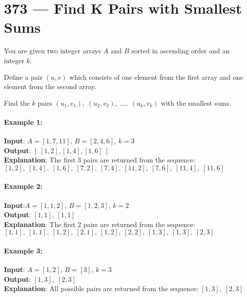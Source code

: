 \section{373 --- Find K Pairs with Smallest Sums}
You are given two integer arrays $ A $ and $ B $ sorted in ascending order and an integer $ k $.
\par
Define a pair $ (u,v) $ which consists of one element from the first array and one element from the second array.
\par
Find the $ k $ pairs $ (u_1,v_1),\; (u_2,v_2), \; \ldots,\;  (u_k,v_k) $ with the smallest sums.

\paragraph{Example 1:}

\begin{flushleft}
\textbf{Input}: $ A = [1,7,11] $, $ B = [2,4,6] $, $ k = 3 $
\\
\textbf{Output}: $[\;[1,2],[1,4],[1,6]\;]$ 
\\
\textbf{Explanation}: The first 3 pairs are returned from the sequence: 
            $  [1,2],\;[1,4],\;[1,6],\;[7,2],\;[7,4],\;[11,2],\;[7,6],\;[11,4],\;[11,6] $
\end{flushleft}

\paragraph{Example 2:}

\begin{flushleft}
\textbf{Input}:$  A = [1,1,2] $, $ B = [1,2,3] $, $ k = 2 $
\\
\textbf{Output}: $ [1,1] $, $ [1,1] $
\\
\textbf{Explanation}: The first 2 pairs are returned from the sequence: 
             $ [1,1],\;[1,1],\;[1,2],\;[2,1],\;[1,2],\;[2,2],\;[1,3],\;[1,3],\;[2,3] $
\end{flushleft}
             
             
\paragraph{Example 3:}

\begin{flushleft}
\textbf{Input}: $A = [1,2]$, $B = [3]$, $ k = 3 $
\\
\textbf{Output}: $ [1,3],\;[2,3] $
\\

\textbf{Explanation}: All possible pairs are returned from the sequence: $ [1,3],\;[2,3] $
\end{flushleft}

